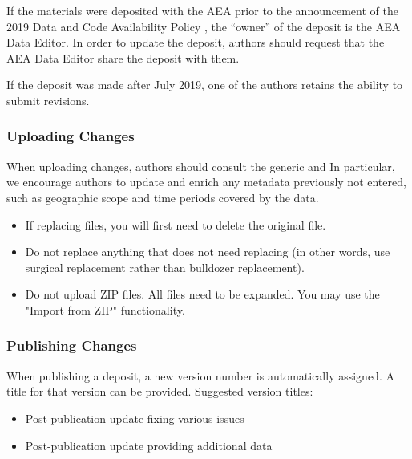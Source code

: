 If the materials were deposited with the AEA prior to the
announcement
of the 2019
Data and Code Availability Policy \citep{10.1257/pandp.110.dcap}, the ``owner'' of the deposit is the
AEA Data Editor. In order to update the deposit, authors should request
that the AEA Data Editor share the deposit with them.

If the deposit was made after July 2019, one of the authors retains the
ability to submit revisions.

\subsubsection{Uploading Changes}\label{uploading-changes}

When uploading changes, authors should consult the generic
 and
 In particular, we encourage authors to update and enrich any
metadata previously not entered, such as geographic scope and time
periods covered by the data.

\begin{itemize}
\tightlist
\item
  If replacing files, you will first need to delete the original file.
\item
  Do not replace anything that does not need replacing (in other words,
  use surgical replacement rather than bulldozer replacement).
\item
  Do not upload ZIP files. All files need to be expanded. You may use
  the "Import from ZIP" functionality.
\end{itemize}

\subsubsection{Publishing Changes}\label{publishing-changes}

When publishing a deposit, a new version number is automatically
assigned. A title for that version can be provided. Suggested version
titles:

\begin{itemize}
\tightlist
\item
  Post-publication update fixing various issues
\item
  Post-publication update providing additional data
\end{itemize}
